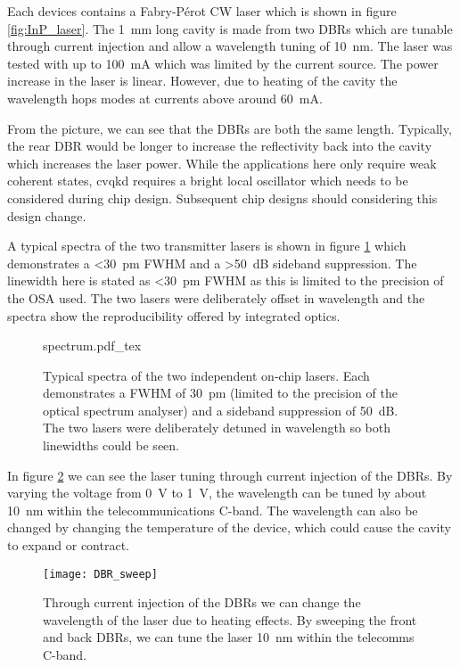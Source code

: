 Each devices contains a Fabry-P\'{e}rot \ac{CW} laser which is shown in figure \ref{fig:InP_laser}. The \SI{1}{mm} long cavity is made from two \acp{DBR} which are tunable through current injection and allow a wavelength tuning of \SI{10}{nm}. The laser was tested with up to \SI{100}{\mA} which was limited by the current source. The power increase in the laser is linear. However, due to heating of the cavity the wavelength hops modes at currents above around \SI{60}{\mA}.

From the picture, we can see that the \acp{DBR} are both the same length. Typically, the rear \ac{DBR} would be longer to increase the reflectivity back into the cavity which increases the laser power. While the applications here only require weak coherent states, \ac{cvqkd} requires a bright local oscillator which needs to be considered during chip design. Subsequent chip designs should considering this design change.

A typical spectra of the two transmitter lasers is shown in figure \ref{fig:spectra} which demonstrates a \SI{<30}{pm} \ac{FWHM} and a \SI{>50}{dB} sideband suppression. The linewidth here is stated as \SI{<30}{pm} \ac{FWHM} as this is limited to the precision of the \ac{OSA} used. The two lasers were deliberately offset in wavelength and the spectra show the reproducibility offered by integrated optics.

\begin{figure}[tbp]
	\centering
	\def\svgwidth{0.8\textwidth} 
	{spectrum.pdf_tex}
	\caption[On-chip laser spectra]{Typical spectra of the two independent on-chip lasers. Each demonstrates a \ac{FWHM} of \SI{30}{pm} (limited to the precision of the optical spectrum analyser) and a sideband suppression of \SI{50}{dB}. The two lasers were deliberately detuned in wavelength so both linewidths could be seen.}
	\label{fig:spectra}
\end{figure}

In figure \ref{fig:DBR_sweep} we can see the laser tuning through current injection of the \acp{DBR}. By varying the voltage from \SI{0}{\V} to \SI{1}{\V}, the wavelength can be tuned by about \SI{10}{\nm} within the telecommunications C-band. The wavelength can also be changed by changing the temperature of the device, which could cause the cavity to expand or contract. 

\begin{figure}[tbp]
	\centering
	\texttt{[image: DBR\_sweep]}
	\caption[Laser wavelength scan with DBR current injection]{Through current injection of the \acp{DBR} we can change the wavelength of the laser due to heating effects. By sweeping the front and back \acp{DBR}, we can tune the laser \SI{10}{\nm} within the telecomms C-band.}
	\label{fig:DBR_sweep}
\end{figure}

